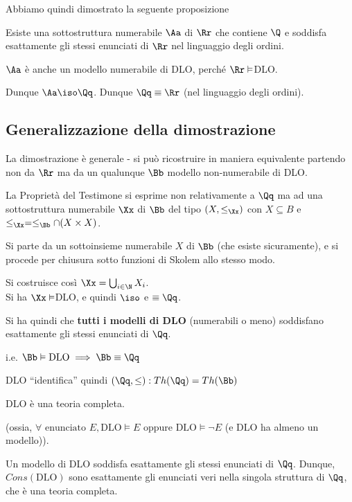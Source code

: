 \documentclass[a4paper,11pt]{report}
\begin{document}
Abbiamo quindi dimostrato la seguente proposizione
\begin{propframe}{}{}
    Esiste una sottostruttura numerabile \( \Aa \) di \( \Rr \) che contiene \( \Q \) e soddisfa esattamente gli stessi enunciati di \( \Rr \) nel linguaggio degli ordini.
\end{propframe}

\( \Aa \) è anche un modello numerabile di DLO, perché \( \Rr \vDash  \)DLO.

Dunque \( \Aa \iso \Qq \). Dunque \( \Qq \equiv \Rr \) (nel linguaggio degli ordini).

\subsection{Generalizzazione della dimostrazione}
    La dimostrazione è generale - si può ricostruire in maniera equivalente partendo non da \( \Rr \) ma da un qualunque \( \Bb \) modello non-numerabile di DLO.

    La Proprietà del Testimone si esprime non relativamente a \( \Qq \) ma ad una sottostruttura numerabile \( \Xx \) di \( \Bb \) del tipo \( (X, \leq_\Xx ) \) con \( X \subseteq B \) e \( \leq_\Xx = \leq_\Bb \cap (X \times X)\).

    Si parte da un sottoinsieme numerabile \( X \) di \( \Bb \) (che esiste sicuramente), e si procede per chiusura sotto funzioni di Skolem allo stesso modo.

    Si costruisce così \( \Xx = \bigcup_{i\in \N} X_i \).\\ 
    Si ha \( \Xx \vDash  \)DLO, e quindi \( \iso  \) e \( \equiv \Qq\).

    \begin{thmframe}{}{}
        Si ha quindi che \textbf{tutti i modelli di DLO} (numerabili o meno) soddisfano esattamente gli stessi enunciati di \( \Qq \).

        i.e. \( \Bb \vDash \text{DLO} \implies \Bb \equiv \Qq \)
    
        DLO ``identifica'' quindi \( (\Qq, \leq ): Th(\Qq) = Th(\Bb) \)
    \end{thmframe}

    \begin{corframe}{}
        DLO è una teoria completa.

        (ossia, \( \forall \text{ enunciato } E, \text{DLO}\vDash E \text{ oppure DLO} \vDash \neg E \) {\color{gray}(e DLO ha almeno un modello)}).

        \begin{pframe}{}{}
            Un modello di DLO soddisfa esattamente gli stessi enunciati di \( \Qq \). Dunque, \( Cons(\text{DLO}) \) sono esattamente gli enunciati veri nella singola struttura di \( \Qq \), che è una teoria completa.
        \end{pframe}
    \end{corframe}
\end{document}

